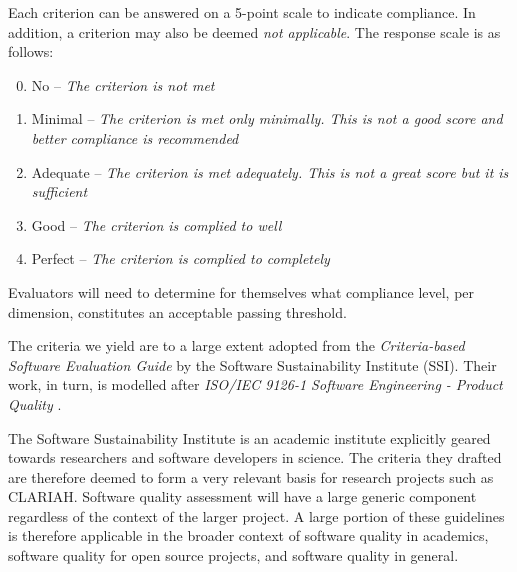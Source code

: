\documentclass[a4paper,11pt]{article}
\begin{document}
Each criterion can be answered on a 5-point scale to indicate compliance. In
addition, a criterion may also be deemed \emph{not applicable}. The response scale is as follows:

\begin{enumerate}
    \setcounter{enumi}{-1} %
    \item No -- \emph{The criterion is not met}
    \item Minimal -- \emph{The criterion is met only minimally. This is not a good score and better compliance is recommended}
    \item Adequate -- \emph{The criterion is met adequately. This is not a great score but it is sufficient}
    \item Good -- \emph{The criterion is complied to well}
    \item Perfect -- \emph{The criterion is complied to completely}
\end{enumerate}

Evaluators will need to determine for themselves what compliance level, per
dimension, constitutes an acceptable passing threshold.

The criteria we yield are  to a large extent adopted from the
\emph{Criteria-based Software Evaluation Guide} \citep{SSIGUIDE} by the Software
Sustainability Institute (SSI). Their work, in turn, is modelled after
\emph{ISO/IEC 9126-1 Software Engineering - Product Quality} \citep{ISO9126}.
%
%
%

The Software Sustainability Institute\citep{SSIGENERAL} is an academic institute
explicitly geared towards researchers and software developers in science. The
criteria they drafted are therefore deemed to form a very relevant basis for
research projects such as CLARIAH. Software quality assessment will have a
large generic component regardless of the context of the larger project. A
large portion of these guidelines is therefore applicable in the broader context
of software quality in academics, software quality for open source projects, and
software quality in general.
\end{document}

